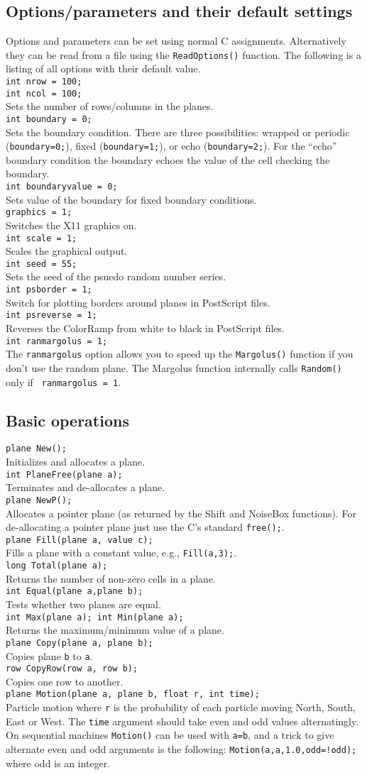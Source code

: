 \documentclass[12pt]{article}
\newcommand{\mtt}[1]{\texttt{\\#1\\}}
\begin{document}
\subsection{Options/parameters and their default settings}
Options and parameters can be set using normal C assignments.
Alternatively they can be read from a file using the 
{\tt ReadOptions()} function. The following is a listing
of all options with their default value.
\mtt{
int nrow = 100;\\int ncol = 100;}
Sets the number of rows/columns in the planes.
\mtt{int boundary = 0;}
Sets the boundary condition.
There are three possibilities: wrapped or periodic ({\tt boundary=0;}), 
fixed ({\tt boundary=1;}), or echo ({\tt boundary=2;}). 
For the ``echo'' boundary condition the boundary echoes the
value of the cell checking the boundary.
\mtt{int boundaryvalue = 0;}
Sets value of the boundary for fixed boundary conditions.
\mtt{graphics = 1;}
Switches the X11 graphics on.
\mtt{int scale = 1;}
Scales the graphical output.
\mtt{int seed = 55;}
Sets the seed of the psuedo random number series.
\mtt{int psborder = 1;}
Switch for plotting borders around planes in PostScript files.
\mtt{int psreverse = 1;}
Reverses the ColorRamp from white to black in PostScript files.
\mtt{int ranmargolus = 1;}
The {\tt ranmargolus} option allows you to speed up the {\tt Margolus()}
function if you don't use the random plane. 
The Margolus function internally calls {\tt Random()} only if {\tt
ranmargolus = 1}.

\subsection{Basic operations}
\texttt{plane New();\\}
Initializes and allocates a plane.
\mtt{ int PlaneFree(plane a);}
Terminates and de-allocates a plane.
\mtt{ plane NewP();}
Allocates a pointer plane (as returned by the Shift and NoiseBox functions).
For de-allocating a pointer plane just use the C's standard {\tt free();}.
\mtt{ plane Fill(plane a, value c);}
Fills a plane with a constant value, e.g., {\tt Fill(a,3);}.
\mtt{ long Total(plane a);}
Returns the number of non-zero cells in a plane.
\mtt{ int Equal(plane a,plane b);}
Tests whether two planes are equal.
\mtt{ int Max(plane a); int Min(plane a);}
Returns the maximum/minimum value of a plane.
\mtt{ plane Copy(plane a, plane b);}
Copies plane {\tt b} to {\tt a}.
\mtt{ row CopyRow(row a, row b);}
Copies one row to another.
\mtt{ plane Motion(plane a, plane b, float r, int time);}
Particle motion where  {\tt r} is the probability of each particle
moving North, South, East or West.
The {\tt time} argument should take even and odd values alternatingly.
On sequential machines {\tt Motion()} can be used with {\tt a=b}, 
and a trick to give
alternate even and odd arguments is the following:
{\tt Motion(a,a,1.0,odd=!odd);} where odd is an integer.
\end{document}
